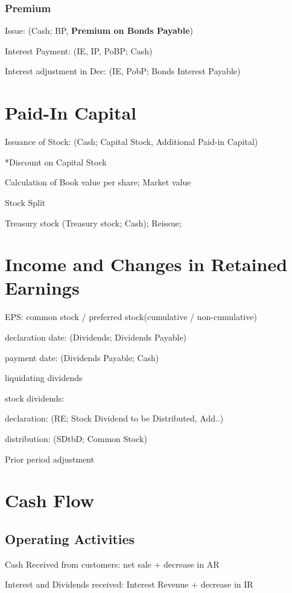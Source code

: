 \documentclass[10pt, a4paper]{article}
\begin{document}
        \subsubsection*{Premium}
            Issue: (Cash; BP, \textbf{Premium on Bonds Payable})

            Interest Payment: (IE, IP, PoBP; Cash) 

            Interest adjustment in Dec: (IE, PobP; Bonds Interest Payable)


\section*{Paid-In Capital}
    Issuance of Stock: (Cash; Capital Stock, Additional Paid-in Capital)

    *Discount on Capital Stock

    Calculation of Book value per share; Market value 

    Stock Split 

    Treasury stock (Treasury stock; Cash); Reissue;

\section*{Income and Changes in Retained Earnings}
    EPS: common stock / preferred stock(cumulative / non-cumulative)

    declaration date: (Dividends; Dividends Payable)

    payment date: (Dividends Payable; Cash)

    liquidating dividends 

    stock dividends:

        \quad declaration: (RE; Stock Dividend to be Distributed, Add..)

        \quad distribution: (SDtbD; Common Stock)

    Prior period adjustment  

\section*{Cash Flow}
\subsection*{Operating Activities}
    Cash Received from customers: net sale + decrease in AR

    Interest and Dividends received: Interest Revenue + decrease in IR
\end{document}

